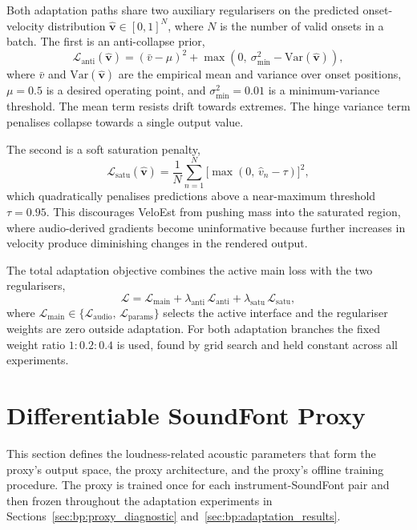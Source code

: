 Both adaptation paths share two auxiliary regularisers on the predicted onset-velocity distribution $\hat{\mathbf{v}} \in [0,1]^{N}$, where $N$ is the number of valid onsets in a batch. The first is an anti-collapse prior,
\begin{equation}
\label{eq:bp_anti_loss}
\mathcal{L}_{\mathrm{anti}}(\hat{\mathbf{v}}) = (\bar{v} - \mu)^2
+ \max\!\left(0,\ \sigma_{\min}^2 - \mathrm{Var}(\hat{\mathbf{v}})\right),
\end{equation}
where $\bar{v}$ and $\mathrm{Var}(\hat{\mathbf{v}})$ are the empirical mean and variance over onset positions, $\mu = 0.5$ is a desired operating point, and $\sigma_{\min}^2 = 0.01$ is a minimum-variance threshold. The mean term resists drift towards extremes. The hinge variance term penalises collapse towards a single output value.

The second is a soft saturation penalty,
\begin{equation}
\label{eq:bp_satu_loss}
\mathcal{L}_{\mathrm{satu}}(\hat{\mathbf{v}}) = \frac{1}{N}\sum_{n=1}^{N}
\bigl[\max(0,\, \hat{v}_n - \tau)\bigr]^2,
\end{equation}
which quadratically penalises predictions above a near-maximum threshold $\tau = 0.95$. This discourages VeloEst from pushing mass into the saturated region, where audio-derived gradients become uninformative because further increases in velocity produce diminishing changes in the rendered output.

The total adaptation objective combines the active main loss with the two regularisers,
\begin{equation}
\label{eq:bp_total_loss}
\mathcal{L} = \mathcal{L}_{\mathrm{main}}
+ \lambda_{\mathrm{anti}}\, \mathcal{L}_{\mathrm{anti}}
+ \lambda_{\mathrm{satu}}\, \mathcal{L}_{\mathrm{satu}},
\end{equation}
where $\mathcal{L}_{\mathrm{main}} \in \{\mathcal{L}_{\mathrm{audio}},\, \mathcal{L}_{\mathrm{params}}\}$ selects the active interface and the regulariser weights are zero outside adaptation. For both adaptation branches the fixed weight ratio $1 : 0.2 : 0.4$ is used, found by grid search and held constant across all experiments.

\section{Differentiable SoundFont Proxy}
\label{sec:bp:diffsfproxy}

This section defines the loudness-related acoustic parameters that form the proxy's output space, the proxy architecture, and the proxy's offline training procedure. The proxy is trained once for each instrument-SoundFont pair and then frozen throughout the adaptation experiments in Sections~\ref{sec:bp:proxy_diagnostic} and~\ref{sec:bp:adaptation_results}.

